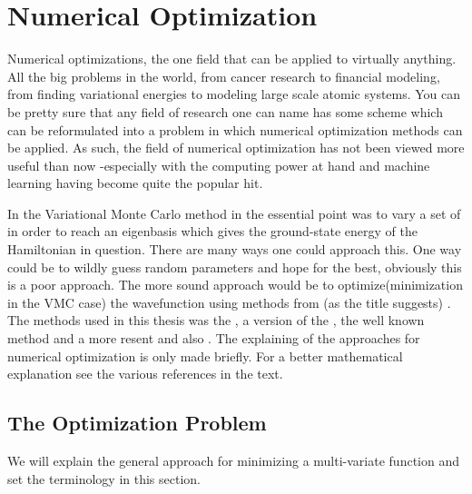 \chapter{Numerical Optimization \label{chapter:4}}
    Numerical optimizations, the one field that can be applied to virtually
    anything. All the big problems in the world, from cancer research to
    financial modeling, from finding variational energies to modeling large
    scale atomic systems. You can be pretty sure that any field of research one
    can name has some scheme which can be reformulated into a problem in which
    numerical optimization methods can be applied. As such, the field of
    numerical optimization has not been viewed more useful than now -especially
    with the computing power at hand and machine learning having become quite
    the popular hit.

    In the Variational Monte Carlo method in  the essential point
    was to vary a set of  in order to reach an
    eigenbasis which gives the ground-state energy of the Hamiltonian in
    question. There are many ways one could approach this. One way could be to
    wildly guess random parameters and hope for the best, obviously this is a
    poor approach. The more sound approach would be to optimize(minimization in
    the VMC case) the wavefunction using methods from (as the title suggests)
    . The methods used in this thesis was the
    , a version of the , the well known  method and a more
    resent  and also . The explaining of the approaches for numerical optimization is
    only made briefly. For a better mathematical explanation see the various
    references in the text.

\section{The Optimization Problem \label{sec:the_optimization_problem}}
    We will explain the general approach for minimizing a multi-variate
    function and set the terminology in this section. \\


